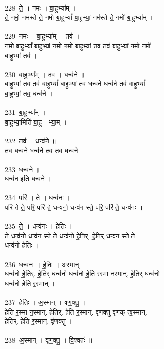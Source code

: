 \\
228. ते॒ । नमः॑ । बा॒हुभ्या᳚म् ।\\
ते॒ नमो॒ नम॑स्ते ते॒ नमो॑ बा॒हुभ्यां᳚ बा॒हुभ्यां॒ नम॑स्ते ते॒ नमो॑ बा॒हुभ्या᳚म् ।\\
\\
229. नमः॑ । बा॒हुभ्या᳚म् । तव॑ ।\\
नमो॑ बा॒हुभ्यां᳚ बा॒हुभ्यां॒ नमो॒ नमो॑ बा॒हुभ्यां॒ तव॒ तव॑ बा॒हुभ्यां॒ नमो॒ नमो॑\\
बा॒हुभ्यां॒ तव॑ ।\\
\\
230. बा॒हुभ्या᳚म् । तव॑ । धन्व॑ने ॥\\
बा॒हुभ्यां॒ तव॒ तव॑ बा॒हुभ्यां᳚ बा॒हुभ्यां॒ तव॒ धन्व॑ने॒ धन्व॑ने॒ तव॑ बा॒हुभ्यां᳚\\
बा॒हुभ्यां॒ तव॒ धन्व॑ने ।\\
\\
231. बा॒हुभ्या᳚म् ।\\
बा॒हुभ्या॒मिति॑ बा॒हु - भ्या॒म् ।\\
\\
232. तव॑ । धन्व॑ने ॥\\
तव॒ धन्व॑ने॒ धन्व॑ने॒ तव॒ तव॒ धन्व॑ने ।\\
\\
233. धन्व॑ने ॥\\
धन्व॑न॒ इति॒ धन्व॑ने ।\\
\\
234. परि॑ । ते॒ । धन्व॑नः ।\\
परि॑ ते ते॒ परि॒ परि॑ ते॒ धन्व॑नो॒ धन्व॑न स्ते॒ परि॒ परि॑ ते॒ धन्व॑नः ।\\
\\
235. ते॒ । धन्व॑नः । हे॒तिः ।\\
ते॒ धन्व॑नो॒ धन्व॑न स्ते ते॒ धन्व॑नो हे॒तिर्. हे॒तिर् धन्व॑न स्ते ते॒\\
धन्व॑नो हे॒तिः ।\\
\\
236. धन्व॑नः । हे॒तिः । अ॒स्मान् ।\\
धन्व॑नो हे॒तिर्. हे॒तिर् धन्व॑नो॒ धन्व॑नो हे॒ति र॒स्मा न॒स्मान्. हे॒तिर् धन्व॑नो॒\\
धन्व॑नो हे॒ति र॒स्मान् ।\\
\\
237. हे॒तिः । अ॒स्मान् । वृ॒ण॒क्तु॒ ।\\
हे॒ति र॒स्मा न॒स्मान्. हे॒तिर्. हे॒ति र॒स्मान्. वृ॑णक्तु वृणक् त्व॒स्मान्.\\
हे॒तिर्. हे॒ति र॒स्मान्. वृ॑णक्तु ।\\
\\
238. अ॒स्मान् । वृ॒ण॒क्तु॒ । वि॒श्वतः॑ ॥\\
